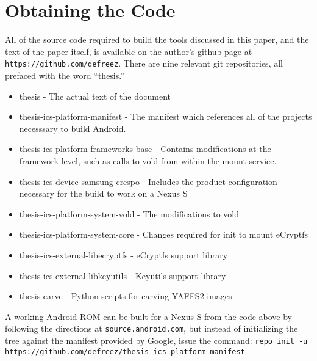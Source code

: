 \chapter{Obtaining the Code}
\label{app:obtaincode}

All of the source code required to build the tools discussed in this paper, and the text of the paper itself,  is available on the author's github page at
\texttt{https://github.com/defreez}. There are nine relevant git repositories, all prefaced with the word ``thesis.''
\begin{itemize}
\item{thesis} - The actual text of the document
\item{thesis-ics-platform-manifest - The manifest which references all of the projects necesssary to build Android.}
\item{thesis-ics-platform-frameworks-base - Contains modifications at the framework level, such as calls to vold from within the
mount service.}
\item{thesis-ics-device-samsung-crespo - Includes the product configuration necessary for the build to work on a Nexus S}
\item{thesis-ics-platform-system-vold - The modifications to vold}
\item{thesis-ics-platform-system-core - Changes required for init to mount eCryptfs}
\item{thesis-ics-external-libecryptfs - eCryptfs support library}
\item{thesis-ics-external-libkeyutils - Keyutils support library}
\item{thesis-carve - Python scripts for carving YAFFS2 images}
\end{itemize}

A working Android ROM can be built for a Nexus S from the code above by following the directions at \texttt{source.android.com}, but
instead of initializing the tree against the manifest provided by Google, issue the command: \texttt{repo init -u
https://github.com/defreez/thesis-ics-platform-manifest}
